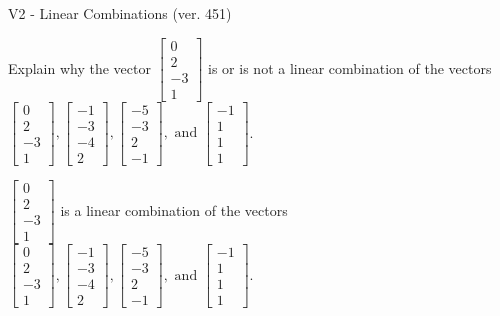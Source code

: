 \begin{exercise}
  \begin{exerciseTitle}V2 - Linear Combinations (ver. 451)\end{exerciseTitle}
  \begin{exerciseStatement}
    Explain why the vector \(\left[\begin{array}{c}
0 \\
2 \\
-3 \\
1
\end{array}\right]\)  is or is not a linear 
	combination of the vectors \(\left[\begin{array}{c}
0 \\
2 \\
-3 \\
1
\end{array}\right] , \left[\begin{array}{c}
-1 \\
-3 \\
-4 \\
2
\end{array}\right] , \left[\begin{array}{c}
-5 \\
-3 \\
2 \\
-1
\end{array}\right] , \text{ and } \left[\begin{array}{c}
-1 \\
1 \\
1 \\
1
\end{array}\right]\).
	


  \end{exerciseStatement}
  \begin{exerciseAnswer}
   \(\left[\begin{array}{c}
0 \\
2 \\
-3 \\
1
\end{array}\right]\) 
  	 is  
	a linear combination of the vectors \(\left[\begin{array}{c}
0 \\
2 \\
-3 \\
1
\end{array}\right] , \left[\begin{array}{c}
-1 \\
-3 \\
-4 \\
2
\end{array}\right] , \left[\begin{array}{c}
-5 \\
-3 \\
2 \\
-1
\end{array}\right] , \text{ and } \left[\begin{array}{c}
-1 \\
1 \\
1 \\
1
\end{array}\right]\).


\end{exerciseAnswer}
\end{exercise}
